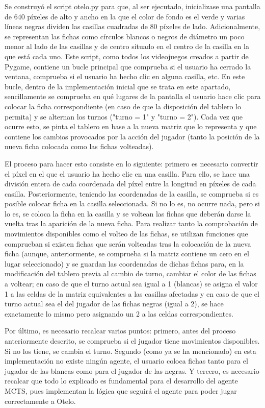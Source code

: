 \documentclass[conference]{IEEEtran}
\begin{document}
Se construyó el script otelo.py para que, al ser ejecutado, inicializase una pantalla de 640 píxeles de alto y ancho en la que el color de fondo es el verde y varias líneas negras dividen las casillas cuadradas de 80 píxeles de lado. Adicionalmente, se representan las fichas como círculos blancos o negros de diámetro un poco menor al lado de las casillas y de centro situado en el centro de la casilla en la que está cada uno. Este script, como todos los videojuegos creados a partir de Pygame, contiene un bucle principal que comprueba si el usuario ha cerrado la ventana, comprueba si el usuario ha hecho clic en alguna casilla, etc. En este bucle, dentro de la implementación inicial que se trata en este apartado, sencillamente se comprueba en qué lugares de la pantalla el usuario hace clic para colocar la ficha correspondiente (en caso de que la disposición del tablero lo permita) y se alternan los turnos ("turno = 1" y "turno = 2"). Cada vez que ocurre esto, se pinta el tablero en base a la nueva matriz que lo representa y que contiene los cambios provocados por la acción del jugador (tanto la posición de la nueva ficha colocada como las fichas volteadas). 

El proceso para hacer esto consiste en lo siguiente: primero es necesario convertir el píxel en el que el usuario ha hecho clic en una casilla. Para ello, se hace una división entera de cada coordenada del píxel entre la longitud en píxeles de cada casilla. Posteriormente, teniendo las coordenadas de la casilla, se comprueba si es posible colocar ficha en la casilla seleccionada. Si no lo es, no ocurre nada, pero si lo es, se coloca la ficha en la casilla y se voltean las fichas que deberán darse la vuelta tras la aparición de la nueva ficha. Para realizar tanto la comprobación de movimientos disponibles como el volteo de las fichas, se utilizan funciones que comprueban si existen fichas que serán volteadas tras la colocación de la nueva ficha (aunque, anteriormente, se comprueba si la matriz contiene un cero en el lugar seleccionado) y se guardan las coordenadas de dichas fichas para, en la modificación del tablero previa al cambio de turno, cambiar el color de las fichas a voltear; en caso de que el turno actual sea igual a 1 (blancas) se asigna el valor 1 a las celdas de la matriz equivalentes a las casillas afectadas y en caso de que el turno actual sea el del jugador de las fichas negras (igual a 2), se hace exactamente lo mismo pero asignando un 2 a las celdas correspondientes.

Por último, es necesario recalcar varios puntos: primero, antes del proceso anteriormente descrito, se comprueba si el jugador tiene movimientos disponibles. Si no los tiene, se cambia el turno. Segundo (como ya se ha mencionado) en esta implementación no existe ningún agente, el usuario coloca fichas tanto para el jugador de las blancas como para el jugador de las negras. Y tercero, es necesario recalcar que todo lo explicado es fundamental para el desarrollo del agente MCTS, pues implementan la lógica que seguirá el agente para poder jugar correctamente a Otelo.
\end{document}
